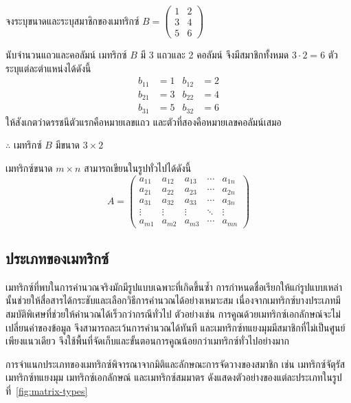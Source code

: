 \begin{ex}
\label{ex:matrix-size-tall}
จงระบุขนาดและระบุสมาชิกของเมทริกซ์ $B = \begin{pmatrix} 1 & 2 \\ 3 & 4 \\ 5 & 6 \end{pmatrix}$
\end{ex}
\begin{solution}
นับจำนวนแถวและคอลัมน์ เมทริกซ์ $B$ มี 3 แถวและ 2 คอลัมน์ จึงมีสมาชิกทั้งหมด $3 \cdot 2 = 6$ ตัว ระบุแต่ละตำแหน่งได้ดังนี้
\begin{align*}
b_{11} &= 1 & b_{12} &= 2\\
b_{21} &= 3 & b_{22} &= 4\\
b_{31} &= 5 & b_{32} &= 6
\end{align*}
ให้สังเกตว่าดรรชนีตัวแรกคือหมายเลขแถว และตัวที่สองคือหมายเลขคอลัมน์เสมอ

$\therefore$ เมทริกซ์ $B$ มีขนาด $3 \times 2$ \solhere
\end{solution}

เมทริกซ์ขนาด $m \times n$ สามารถเขียนในรูปทั่วไปได้ดังนี้
\[
A = \begin{pmatrix}
a_{11} & a_{12} & a_{13} & \cdots & a_{1n} \\
a_{21} & a_{22} & a_{23} & \cdots & a_{2n} \\
a_{31} & a_{32} & a_{33} & \cdots & a_{3n} \\
\vdots & \vdots & \vdots & \ddots & \vdots \\
a_{m1} & a_{m2} & a_{m3} & \cdots & a_{mn}
\end{pmatrix}
\]

\subsection{ประเภทของเมทริกซ์}
\label{ssec:matrix-types}
เมทริกซ์ที่พบในการคำนวณจริงมักมีรูปแบบเฉพาะที่เกิดขึ้นซ้ำ การกำหนดชื่อเรียกให้แก่รูปแบบเหล่านั้นช่วยให้สื่อสารได้กระชับและเลือกวิธีการคำนวณได้อย่างเหมาะสม เนื่องจากเมทริกซ์บางประเภทมีสมบัติพิเศษที่ช่วยให้คำนวณได้เร็วกว่ากรณีทั่วไป ตัวอย่างเช่น การคูณด้วยเมทริกซ์เอกลักษณ์จะไม่เปลี่ยนค่าของข้อมูล จึงสามารถละเว้นการคำนวณได้ทันที และเมทริกซ์ทแยงมุมมีสมาชิกที่ไม่เป็นศูนย์เพียงแนวเดียว จึงใช้พื้นที่จัดเก็บและขั้นตอนการคูณน้อยกว่าเมทริกซ์ทั่วไปอย่างมาก

การจำแนกประเภทของเมทริกซ์พิจารณาจากมิติและลักษณะการจัดวางของสมาชิก เช่น เมทริกซ์จัตุรัส เมทริกซ์ทแยงมุม เมทริกซ์เอกลักษณ์ และเมทริกซ์สมมาตร ดังแสดงตัวอย่างของแต่ละประเภทในรูปที่~\ref{fig:matrix-types}~\parencite{lay2021linear}

